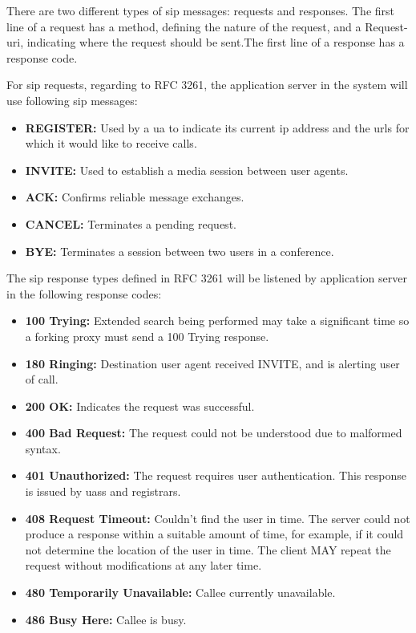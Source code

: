 \par There are two different types of \gls{sip} messages: requests and responses. The first line of a request has a method, defining the nature of the request, and a Request-\gls{uri}, indicating where the request should be sent.The first line of a response has a response code.

\noindent For sip requests, regarding to RFC 3261\cite{rfc:3261}, the application server in the system will use following \gls{sip} messages:

\begin{itemize}[topsep=-1em,parsep=0em,itemsep=0em]
 \item \textbf{REGISTER:} Used by a \gls{ua} to indicate its current \gls{ip} address and the \gls{url}s for which it would like to receive calls.
 \item \textbf{INVITE:} Used to establish a media session between user agents.
 \item \textbf{ACK:} Confirms reliable message exchanges.
 \item \textbf{CANCEL:} Terminates a pending request.
 \item \textbf{BYE:} Terminates a session between two users in a conference.
\end{itemize}

\noindent The \gls{sip} response types defined in RFC 3261 will be listened by application server in the following response codes\cite{wiki:sip_response_codes}:

\begin{itemize}[topsep=-1em,parsep=0em,itemsep=0em]
 \item \textbf{100 Trying:} Extended search being performed may take a significant time so a forking proxy must send a 100 Trying response.
 \item \textbf{180 Ringing:} Destination user agent received INVITE, and is alerting user of call.
 \item \textbf{200 OK:} Indicates the request was successful.
 \item \textbf{400 Bad Request:} The request could not be understood due to malformed syntax.
 \item \textbf{401 Unauthorized:} The request requires user authentication. This response is issued by \gls{uas}s and registrars.
 \item \textbf{408 Request Timeout:} Couldn't find the user in time. The server could not produce a response within a suitable amount of time, for example, if it could not determine the location of the user in time. The client MAY repeat the request without modifications at any later time.
 \item \textbf{480 Temporarily Unavailable:} Callee currently unavailable.
 \item \textbf{486 Busy Here:} Callee is busy.
\end{itemize}

